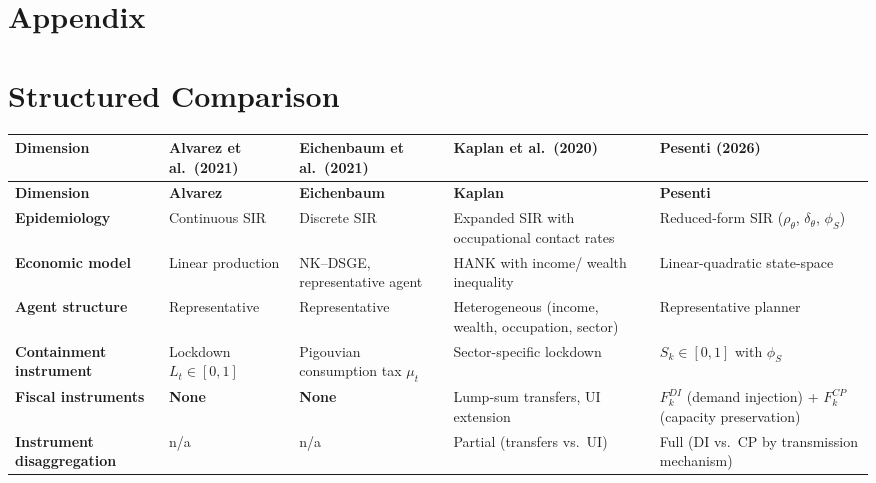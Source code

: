 \documentclass[12pt, a4paper]{article}
\begin{document}




\floatbarrier

\newpage
\section{Appendix}

\appendix

\section{Structured Comparison}
\label{app:structured_comp}

\begin{small}
\begin{longtable}{P{3.2cm}P{3cm}P{3cm}P{3cm}P{3cm}}
\toprule
\textbf{Dimension} & \textbf{Alvarez et al.\ (2021)} & \textbf{Eichenbaum et al.\ (2021)} & \textbf{Kaplan et al.\ (2020)} & \textbf{Pesenti (2026)} \\
\midrule
\endfirsthead
\toprule
\textbf{Dimension} & \textbf{Alvarez} & \textbf{Eichenbaum} & \textbf{Kaplan} & \textbf{Pesenti} \\
\midrule
\endhead

\textbf{Epidemiology} & Continuous SIR & Discrete SIR & Expanded SIR with occupational contact rates & Reduced-form SIR ($\rho_\theta$, $\delta_\theta$, $\phi_S$) \\
\midrule

\textbf{Economic model} & Linear production & NK--DSGE, representative agent & HANK with income/ wealth inequality & Linear-quadratic state-space \\
\midrule

\textbf{Agent structure} & Representative & Representative & Heterogeneous (income, wealth, occupation, sector) & Representative planner \\
\midrule

\textbf{Containment instrument} & Lockdown $L_t \in [0,1]$ & Pigouvian consumption tax $\mu_t$ & Sector-specific lockdown & $S_k \in [0,1]$ with $\phi_S$ \\
\midrule

\textbf{Fiscal instruments} & \textbf{None} & \textbf{None} & Lump-sum transfers, UI extension & $F_k^{DI}$ (demand injection) + $F_k^{CP}$ (capacity preservation) \\
\midrule

\textbf{Instrument disaggregation} & n/a & n/a & Partial (transfers vs.\ UI) & Full (DI vs.\ CP by transmission mechanism) \\
\midrule


\end{longtable}
\end{small}
\end{document}
